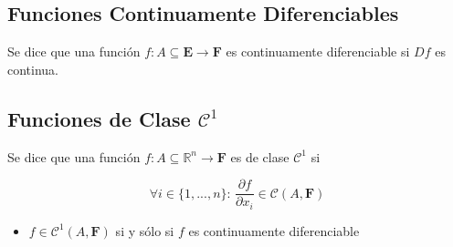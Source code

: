 \subsection{Funciones Continuamente Diferenciables}

Se dice que una función $f:A\subseteq\mathbf{E}\to\mathbf{F}$ es continuamente diferenciable si $Df$ es continua.

\subsection{Funciones de Clase $\mathcal{C}^1$}

Se dice que una función $f:A\subseteq\mathbb{R}^n\to\mathbf{F}$ es de clase $\mathcal{C}^1$ si

\[\forall i\in\{1,...,n\}:\,\frac{\partial f}{\partial x_i}\in \mathcal{C}(A,\mathbf{F})\]

\begin{itemize}
    \item $f\in\mathcal{C}^1(A,\mathbf{F})$ si y sólo si $f$ es continuamente diferenciable
\end{itemize}

\newpage
